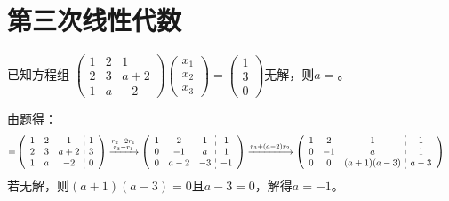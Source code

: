\documentclass[a4paper]{report}
\begin{document}
\section{第三次线性代数}
\setcounter{Emp}{14}

\EX 已知方程组
$
\begin{pmatrix}
1&2&1\\
2&3&a+2\\
1&a&-2
\end{pmatrix}
\begin{pmatrix}
x_1\\ x_2\\ x_3
\end{pmatrix}=
\begin{pmatrix}
1\\ 3\\ 0
\end{pmatrix}
$无解，则$a=$\underline{\hphantom{~~~~~~~~~}}。

\begin{jie}
由题得：
\begin{align*}
[A|B]=&
\left(
 \begin{array}{c:c}
\begin{matrix}
1 & 2 & 1\\
2 & 3 & a+2 \\
1 & a & -2
\end{matrix}&
\begin{matrix}
1  \\
3 \\
0
\end{matrix}
\end{array}
\right)\xrightarrow{\substack{r_{2}-2r_{1}\\ r_{3}-r_{1}}}
{
\left(
 \begin{array}{c:c}
\begin{matrix}
1 & 2 & 1\\
0 & -1 & a \\
0 & a-2 & -3
\end{matrix}&
\begin{matrix}
1  \\
1\\
-1
\end{matrix}
\end{array}
\right)
}\xrightarrow{\substack{ r_{3}+(a-2)r_{2}}}
{
\left(
 \begin{array}{c:c}
\begin{matrix}
1 & 2 & 1\\
0 & -1 & a \\
0 & 0 & (a+1)(a-3)
\end{matrix}&
\begin{matrix}
1  \\
1\\
a-3
\end{matrix}
\end{array}
\right)
}
\end{align*}
若无解，则$(a+1)(a-3)=0$且$a-3=0$，解得$a=-1$。
\end{jie}
\end{document}
